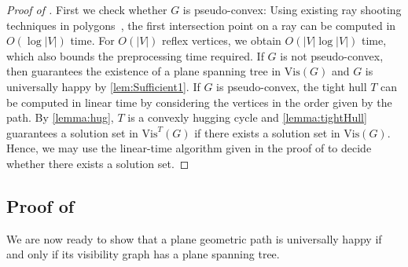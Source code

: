 \documentclass[a4paper,runningheads,cleveref,thm-restate]{lipics-v2021}
\newcommand{\Vis}[1]{\ensuremath{\mathrm{Vis}(#1)}}
\newcommand{\VisHug}[2]{\ensuremath{\mathrm{Vis}^#1(#2)}}
\newcommand{\hset}{solution set\xspace}
\newcommand{\pseudoconvex}{pseudo-convex\xspace}
\newcommand{\hug}{hugging cycle\xspace}
\begin{document}
\begin{proof}[Proof of ]
 First we check whether $G$ is \pseudoconvex: {Using existing ray shooting techniques in polygons~\cite{chazelle1994ray,GuibasHS91}, the first intersection point on a ray can be computed in $O(\log|V|)$ time. For $O(|V|)$ reflex vertices, we obtain $O(|V|\log |V|)$ time, which also bounds the preprocessing time required.} %
 If $G$ is not \pseudoconvex, then  guarantees the existence of a plane spanning tree in \Vis{G} and $G$ is universally happy by \cref{lem:Sufficient1}.
  If $G$ is  \pseudoconvex, the tight hull $T$ {can be computed in linear time by considering the vertices in the order given by the path. By \cref{lemma:hug},} 
  $T$ is a convexly \hug  and \cref{lemma:tightHull} guarantees a \hset in $\VisHug{T}{G}$  if there exists a \hset in  $\Vis{G}$.
 Hence, we may use the linear-time algorithm given in the proof of  to decide whether there exists a \hset.
\end{proof}


\subsection{Proof of }
\label{subsec::univHappinessPaths}

We are now ready to show that a plane geometric path is universally happy if and only if its visibility graph has a plane spanning tree.
\end{document}
